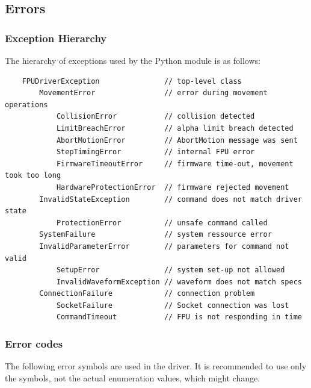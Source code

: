 \documentclass[11pt,a4paper]{scrartcl}
\begin{document}
\subsection{Errors}
\label{sec:errors}

\subsubsection{Exception Hierarchy}
\label{sec:ExceptionsReference}
The hierarchy of exceptions used by the Python module is as follows:

\begin{verbatim}
    FPUDriverException               // top-level class
        MovementError                // error during movement operations
            CollisionError           // collision detected
            LimitBreachError         // alpha limit breach detected
            AbortMotionError         // AbortMotion message was sent
            StepTimingError          // internal FPU error
            FirmwareTimeoutError     // firmware time-out, movement took too long
            HardwareProtectionError  // firmware rejected movement
        InvalidStateException        // command does not match driver state
            ProtectionError          // unsafe command called
        SystemFailure                // system ressource error
        InvalidParameterError        // parameters for command not valid
            SetupError               // system set-up not allowed
            InvalidWaveformException // waveform does not match specs
        ConnectionFailure            // connection problem
            SocketFailure            // Socket connection was lost
            CommandTimeout           // FPU is not responding in time

\end{verbatim}

\subsubsection{Error codes}
\label{sec:errorcodes}

The following error symbols are used in the driver.  It is recommended
to use only the symbols, not the actual enumeration values, which
might change.
\end{document}
